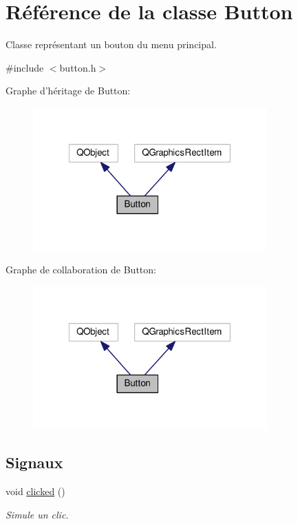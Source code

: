 \hypertarget{classButton}{\section{Référence de la classe Button}
\label{classButton}
}


Classe représentant un bouton du menu principal.  




{\ttfamily \#include $<$button.\+h$>$}



Graphe d'héritage de Button\+:\nopagebreak
\begin{figure}[H]
\begin{center}
\leavevmode
\includegraphics[width=255pt]{d5/dbb/classButton__inherit__graph}
\end{center}
\end{figure}


Graphe de collaboration de Button\+:\nopagebreak
\begin{figure}[H]
\begin{center}
\leavevmode
\includegraphics[width=255pt]{d6/dbf/classButton__coll__graph}
\end{center}
\end{figure}
\subsection*{Signaux}
\begin{DoxyCompactItemize}
\item 
\hypertarget{classButton_a9e7ab4152cb1e7e3beb7f2842f32670c}{void \hyperlink{classButton_a9e7ab4152cb1e7e3beb7f2842f32670c}{clicked} ()}\label{classButton_a9e7ab4152cb1e7e3beb7f2842f32670c}

\begin{DoxyCompactList}\small\item\em Simule un clic. \end{DoxyCompactList}\end{DoxyCompactItemize}
